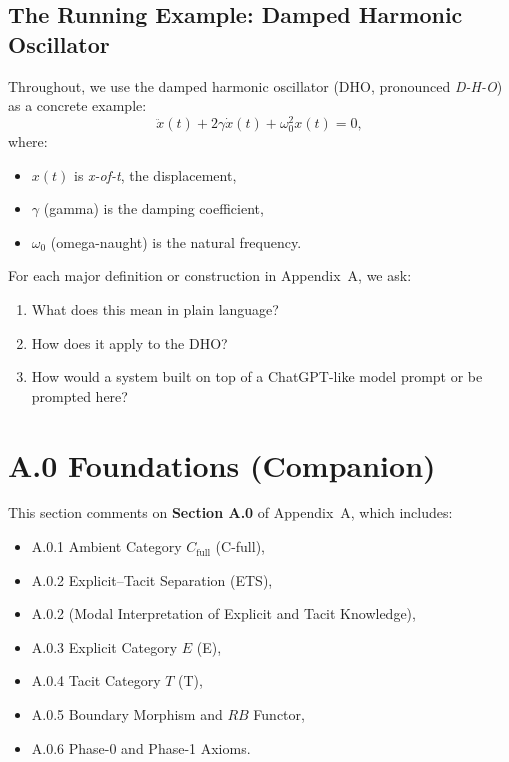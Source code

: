 \subsection*{The Running Example: Damped Harmonic Oscillator}

Throughout, we use the damped harmonic oscillator (DHO, pronounced \emph{D-H-O}) as a concrete
example:
\[
\ddot{x}(t) + 2\gamma \dot{x}(t) + \omega_0^2 x(t) = 0,
\]
where:
\begin{itemize}
 \item $x(t)$ is \emph{x-of-t}, the displacement,
 \item $\gamma$ (gamma) is the damping coefficient,
 \item $\omega_0$ (omega-naught) is the natural frequency.
\end{itemize}

For each major definition or construction in Appendix~A, we ask:

\begin{enumerate}
 \item What does this mean in plain language?
 \item How does it apply to the DHO?
 \item How would a system built on top of a ChatGPT-like model prompt or be prompted here?
\end{enumerate}

\newpage

\section{A.0 Foundations (Companion)}

This section comments on \textbf{Section A.0} of Appendix~A, which includes:

\begin{itemize}
 \item A.0.1 Ambient Category $C_{\text{full}}$ (C-full),
 \item A.0.2 Explicit--Tacit Separation (ETS),
 \item A.0.2 (Modal Interpretation of Explicit and Tacit Knowledge),
 \item A.0.3 Explicit Category $E$ (E),
 \item A.0.4 Tacit Category $T$ (T),
 \item A.0.5 Boundary Morphism and $RB$ Functor,
 \item A.0.6 Phase-0 and Phase-1 Axioms.
\end{itemize}

